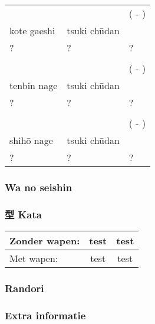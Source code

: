 \begin{table}[H]
\begin{center}
\begin{tabular}{lll}
    \ruby{}{} & \ruby{}{} & (\ruby{}{} - \ruby{}{})\\
    kote gaeshi & tsuki ch\={u}dan & \\
    ? & ? & ?\\
    \\
    \ruby{}{} & \ruby{}{} & (\ruby{}{} - \ruby{}{})\\
    tenbin nage & tsuki ch\={u}dan & \\
    ? & ? & ?\\
    \\
    \ruby{}{} & \ruby{}{} & (\ruby{}{} - \ruby{}{})\\
    shih\={o} nage & tsuki ch\={u}dan & \\ 
    ? & ? & ?
\end{tabular}
\end{center}
\label{dan_2_bukidori_hanbo}
\end{table}

\subsubsection{Wa no seishin}

\subsubsection{型 Kata}
\begin{table}[H]
\begin{center}
\begin{tabular}{lcc}
    Zonder wapen: & test & test \\
    \hline
    Met wapen: & test & test
\end{tabular}
\end{center}
\label{kata_dan_2}
\end{table}

\subsubsection{Randori}

\subsubsection{Extra informatie}

